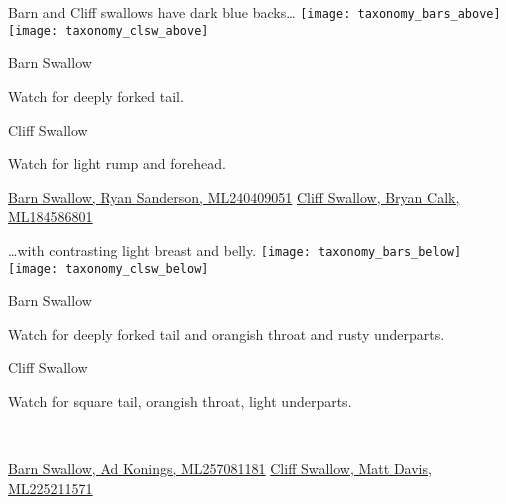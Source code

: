 \documentclass[t]{beamer}
\newcommand{\backoneline}{\vspace{-\baselineskip}}
\begin{document}
%

\begin{frame}{Barn and Cliff swallows have dark blue backs\dots}
	\texttt{[image: taxonomy\_bars\_above]}\hfill
	\texttt{[image: taxonomy\_clsw\_above]}
	
	\backoneline
	
	\begin{multicols}{2}
		Barn Swallow
		
		\medskip
		
		Watch for deeply forked tail.
		
		\medskip
		
		\columnbreak
		
		Cliff Swallow
		
		\medskip
		
		Watch for light rump and forehead.
	\end{multicols}	
	
	\vfilll
	
	\tiny
	
	\href{https://macaulaylibrary.org/asset/240409051}{Barn Swallow, Ryan Sanderson, ML240409051} \hfill 
	\href{https://macaulaylibrary.org/asset/184586801}{Cliff Swallow, Bryan Calk, ML184586801}
	
	
\end{frame}


%

\begin{frame}{\dots with contrasting light breast and belly.}
	\texttt{[image: taxonomy\_bars\_below]}\hfill
	\texttt{[image: taxonomy\_clsw\_below]}

	\backoneline
	
	\begin{multicols}{2}
		Barn Swallow
		
		\medskip
		
		Watch for deeply forked tail and orangish throat and rusty underparts.
		
		\columnbreak
		
		Cliff Swallow
		
		\medskip
		
		Watch for square tail, orangish throat, light underparts.
		
		\vfill\
		
	\end{multicols}	
	
	\vfilll
	
	\tiny
	
	\href{https://macaulaylibrary.org/asset/257081181}{Barn Swallow, Ad Konings, ML257081181} \hfill 
	\href{https://macaulaylibrary.org/asset/225211571}{Cliff Swallow, Matt Davis, ML225211571}


\end{frame}
\end{document}
